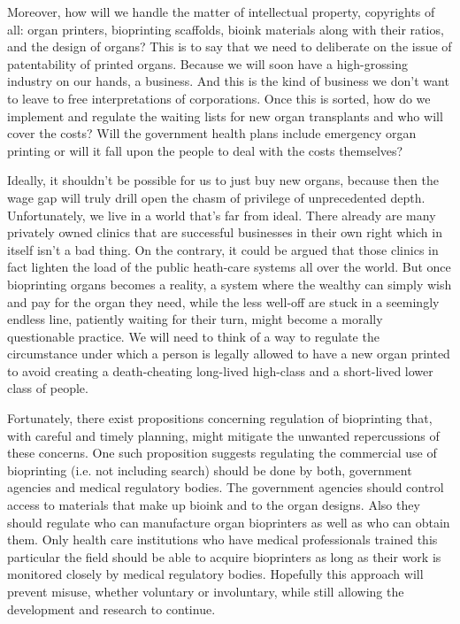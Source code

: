 \documentclass[12pt]{article} %
\begin{document}
Moreover, how will we handle the matter of intellectual property, copyrights of all: organ printers, bioprinting scaffolds, bioink materials along with their ratios, and the design of organs?  This is to say that we need to deliberate on the issue\footnotemark{} of patentability of printed organs. 
Because we will soon have a high-grossing industry on our hands, a business. And this is the kind of business we don't want to leave to free interpretations of corporations. 
Once this is sorted, how do we implement and regulate the waiting lists for new organ transplants and who will cover the costs? Will the government health plans include emergency organ printing or will it fall upon the people to deal with the costs themselves? 

Ideally, it shouldn't be possible for us to just buy new organs, because then the wage gap will truly drill open the chasm of privilege of unprecedented depth. Unfortunately, we live in a world that's far from ideal. There already are many privately owned clinics that are successful businesses in their own right which in itself isn't a bad thing. 
On the contrary, it could be argued that those clinics in fact lighten the load of the public heath-care systems all over the world. But once bioprinting organs becomes a reality, a system where the wealthy can simply wish and pay for the organ they need, while the less well-off are stuck in a seemingly endless line, patiently waiting for their turn, might become a morally questionable practice. We will need to think of a way to regulate the circumstance under which a person is legally allowed to have a new organ printed to avoid creating a death-cheating long-lived high-class and a short-lived lower class of people.

Fortunately, there exist propositions \cite{Tran:2014} concerning regulation of bioprinting that, with careful and timely planning, might mitigate the unwanted repercussions of these concerns. One such proposition suggests regulating the commercial use of bioprinting (i.e. not including search) should be done by both, government agencies and medical regulatory bodies. The government agencies should control access to materials that make up bioink and to the organ designs. Also they should regulate who can manufacture organ bioprinters as well as who can obtain them. Only health care institutions who have medical professionals trained this particular the field should be able to acquire bioprinters as long as their work is monitored closely by medical regulatory bodies. Hopefully this approach will prevent misuse, whether voluntary or involuntary, while still allowing the development and research to continue.
\end{document}
